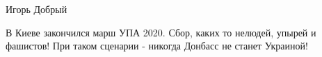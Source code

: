  
 

Игорь Добрый

В Киеве закончился марш УПА 2020. Сбор, каких то нелюдей, упырей и фашистов!
При таком сценарии - никогда Донбасс не станет Украиной!
